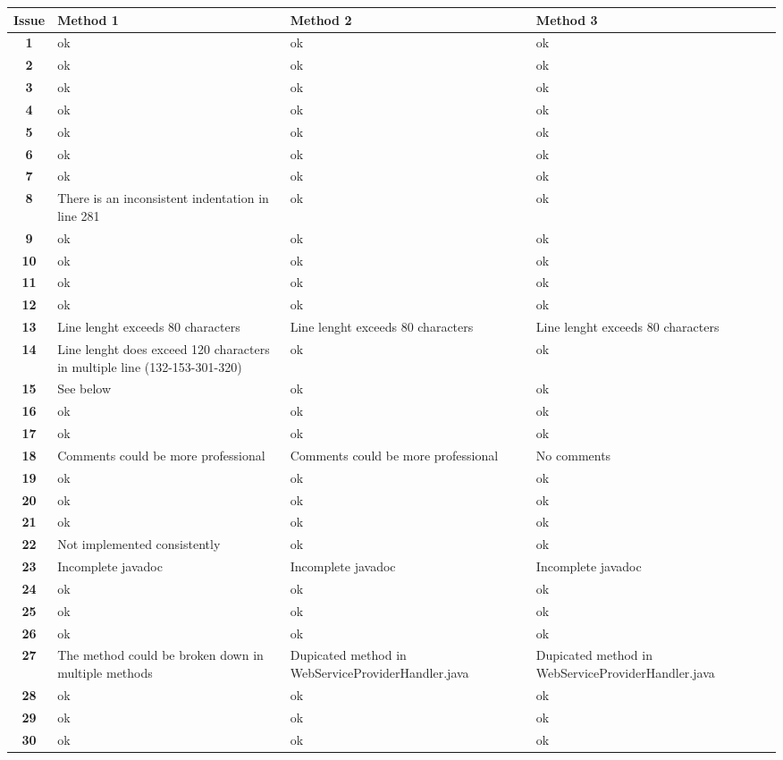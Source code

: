 \newpage
\begin{tabular}{|c|p{4cm}|p{4cm}|p{4cm}|}
\hline
\large{\textbf{Issue}} & \large{\textbf{Method 1}} & \large{\textbf{Method 2}} & \large{\textbf{Method 3}}\\
\hline
\textbf{1} & ok & ok & ok\\
\hline
\textbf{2} & ok & ok & ok\\
\hline
\textbf{3} & ok & ok & ok\\
\hline
\textbf{4} & ok & ok & ok\\
\hline
\textbf{5} & ok & ok & ok\\
\hline
\textbf{6} & ok & ok & ok\\
\hline
\textbf{7} & ok & ok & ok\\
\hline
\textbf{8} & There is an inconsistent indentation in line 281 & ok & ok \\
\hline
\textbf{9} & ok & ok  & ok \\
\hline
\textbf{10} & ok & ok & ok \\
\hline
\textbf{11} & ok & ok & ok \\
\hline
\textbf{12} & ok & ok & ok \\
\hline
\textbf{13} & Line lenght exceeds 80 characters & Line lenght exceeds 80 characters & Line lenght exceeds 80 characters \\
\hline
\textbf{14} & Line lenght does exceed 120 characters in multiple line (132-153-301-320) & ok & ok \\
\hline
\textbf{15} & See below & ok & ok \\
\hline
\textbf{16} & ok & ok & ok \\
\hline
\textbf{17} & ok & ok & ok \\
\hline
\textbf{18} & Comments could be more professional & Comments could be more professional & No comments \\
\hline
\textbf{19} & ok & ok & ok \\
\hline
\textbf{20} & ok & ok & ok \\
\hline
\textbf{21} & ok & ok & ok \\
\hline
\textbf{22} & Not implemented consistently & ok & ok \\
\hline
\textbf{23} & Incomplete javadoc & Incomplete javadoc & Incomplete javadoc \\
\hline
\textbf{24} & ok & ok & ok \\
\hline
\textbf{25} & ok & ok & ok \\
\hline
\textbf{26} & ok & ok & ok \\
\hline
\textbf{27} & The method could be broken down in multiple methods & Dupicated method in WebServiceProviderHandler.java & Dupicated method in WebServiceProviderHandler.java \\
\hline
\textbf{28} & ok & ok & ok \\
\hline
\textbf{29} & ok & ok & ok \\
\hline
\textbf{30} & ok & ok & ok \\
\hline
\end{tabular}
\newpage

